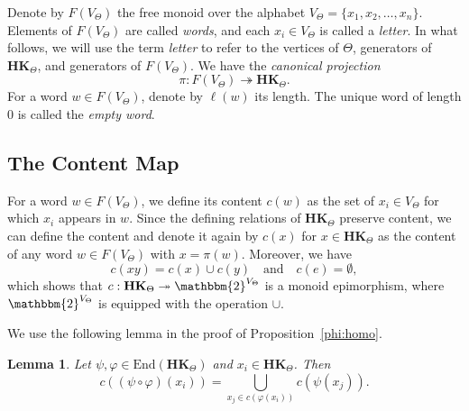 \documentclass[pdflatex,sn-mathphys-num]{sn-jnl}
\newcommand{\hk}{\mathbf{HK}_{\Theta}}
\newcommand{\vp}{\varphi}
\newtheorem{lemma}[theorem]{Lemma}
\theoremstyle{definition}
\theoremstyle{remark}
\begin{document}
Denote by $F(V_{\Theta})$ the free monoid over the alphabet $V_{\Theta} = \{x_1, x_2, \dots, x_n\}$.
Elements of $F(V_{\Theta})$ are called \emph{words}, and each $x_i \in V_{\Theta}$ is called a \emph{letter}.
In what follows, we will use the term \emph{letter} to refer to the vertices of $\Theta$, generators of $\hk$, and generators of $F(V_{\Theta})$.
We have the \emph{canonical projection}
\[
\pi : F(V_{\Theta}) \twoheadrightarrow \hk.
\]
For a word $w \in F(V_{\Theta})$, denote by $\ell(w)$ its length.
The unique word of length $0$ is called the \emph{empty word}.



























\subsection{The Content Map}

For a word $w \in F(V_{\Theta})$, we define its content $c(w)$ as the set of $x_i \in V_{\Theta}$ for which $x_i$ appears in $w$.
Since the defining relations of $\hk$ preserve content, we can define the content and denote it again by $c(x)$ for $x \in \hk$ as the content of any word $w \in F(V_{\Theta})$ with $x = \pi(w)$.
Moreover, we have 
\[
c(xy) = c(x) \cup c(y) \quad \text{and} \quad c(e) = \emptyset,
\]
which shows that $c : \hk \twoheadrightarrow \mathbbm{2}^{V_{\Theta}}$ is a monoid epimorphism, where $\mathbbm{2}^{V_{\Theta}}$ is equipped with the operation $\cup$.

We use the following lemma in the proof of Proposition~\ref{phi:homo}.
\begin{lemma}\label{content:lemma}
   Let $\psi, \vp \in \mathrm{End}(\hk)$ and $x_i \in \hk$.
   Then 
   \[
   c((\psi \circ \vp)(x_i)) = \bigcup_{x_j \in c(\vp(x_i))} c(\psi(x_j)).
   \]
\end{lemma}
\end{document}
